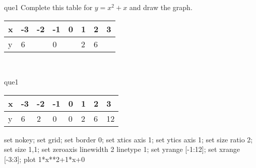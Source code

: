 \documentclass[13.5pt, varwidth=true]{beamer}
\begin{document}
\begin{frame}[shrink=19,fragile]
	\begin{beamercolorbox}[rounded=true, left, shadow=true,wd=14.8cm]{que1}
		 Complete this table for $y = x^{2} + x$ and draw the graph. \\[0.3cm] \renewcommand{\arraystretch}{1.2}\begin{tabular}{|C|C|C|C|C|C|C|C|} \hline x & -3 & -2 & -1 & 0 & 1 & 2 & 3 \\ \hline y & 6 &  & 0 &  & 2 & 6 & \\ \hline \end{tabular}\\[0.3cm]
	\end{beamercolorbox}
\end{frame}
\begin{frame}[shrink=19,fragile]
	\begin{beamercolorbox}[rounded=true, left, shadow=true,wd=14.8cm]{que1}
		\renewcommand{\arraystretch}{1.2}\begin{tabular}{|C|C|C|C|C|C|C|C|} \hline x & -3 & -2 & -1 & 0 & 1 & 2 & 3 \\ \hline y & 6 & 2 & 0 & 0 & 2 & 6 & 12\\ \hline \end{tabular}\begin{gnuplot}[terminal=pdf] set nokey; set grid; set border 0; set xtics axis 1; set ytics axis 1; set size ratio 2; set size 1,1; set zeroaxis linewidth 2 linetype 1; set yrange [-1:12]; set xrange [-3:3]; plot 1*x**2+1*x+0 \end{gnuplot}
	\end{beamercolorbox}
\end{frame}
\end{document}
